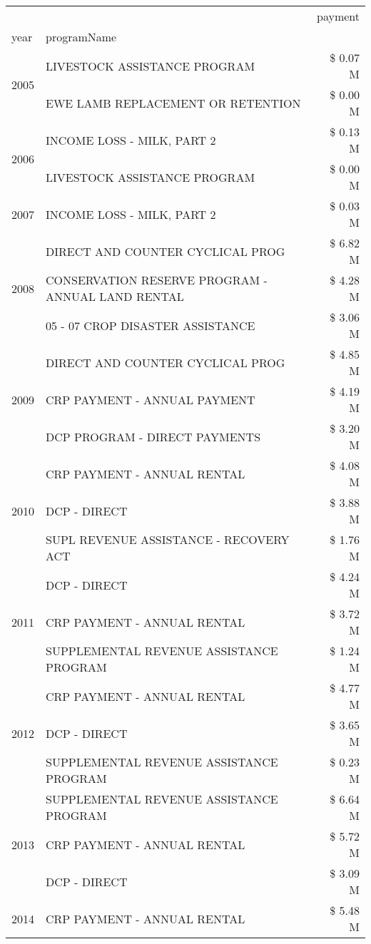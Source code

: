 \begin{tabular}{llr}
\toprule
 &  & payment \\
year & programName &  \\
\midrule
\multirow[t]{2}{*}{2005} & LIVESTOCK ASSISTANCE PROGRAM & \$ 0.07 M \\
 & EWE LAMB REPLACEMENT OR RETENTION & \$ 0.00 M \\
\cline{1-3}
\multirow[t]{2}{*}{2006} & INCOME LOSS - MILK, PART 2 & \$ 0.13 M \\
 & LIVESTOCK ASSISTANCE PROGRAM & \$ 0.00 M \\
\cline{1-3}
2007 & INCOME LOSS - MILK, PART 2 & \$ 0.03 M \\
\cline{1-3}
\multirow[t]{3}{*}{2008} & DIRECT AND COUNTER CYCLICAL PROG & \$ 6.82 M \\
 & CONSERVATION RESERVE PROGRAM - ANNUAL LAND RENTAL & \$ 4.28 M \\
 & 05 - 07 CROP DISASTER ASSISTANCE & \$ 3.06 M \\
\cline{1-3}
\multirow[t]{3}{*}{2009} & DIRECT AND COUNTER CYCLICAL PROG & \$ 4.85 M \\
 & CRP PAYMENT - ANNUAL PAYMENT & \$ 4.19 M \\
 & DCP PROGRAM - DIRECT PAYMENTS & \$ 3.20 M \\
\cline{1-3}
\multirow[t]{3}{*}{2010} & CRP PAYMENT - ANNUAL RENTAL & \$ 4.08 M \\
 & DCP - DIRECT & \$ 3.88 M \\
 & SUPL REVENUE ASSISTANCE - RECOVERY ACT & \$ 1.76 M \\
\cline{1-3}
\multirow[t]{3}{*}{2011} & DCP - DIRECT & \$ 4.24 M \\
 & CRP PAYMENT - ANNUAL RENTAL & \$ 3.72 M \\
 & SUPPLEMENTAL REVENUE ASSISTANCE PROGRAM & \$ 1.24 M \\
\cline{1-3}
\multirow[t]{3}{*}{2012} & CRP PAYMENT - ANNUAL RENTAL & \$ 4.77 M \\
 & DCP - DIRECT & \$ 3.65 M \\
 & SUPPLEMENTAL REVENUE ASSISTANCE PROGRAM & \$ 0.23 M \\
\cline{1-3}
\multirow[t]{3}{*}{2013} & SUPPLEMENTAL REVENUE ASSISTANCE PROGRAM & \$ 6.64 M \\
 & CRP PAYMENT - ANNUAL RENTAL & \$ 5.72 M \\
 & DCP - DIRECT & \$ 3.09 M \\
\cline{1-3}
\multirow[t]{3}{*}{2014} & CRP PAYMENT - ANNUAL RENTAL & \$ 5.48 M \\

\end{tabular}
